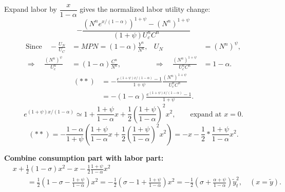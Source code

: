 \documentclass[11pt,fleqn]{article}
\begin{document}
Expand labor by $\dfrac{x}{1-\alpha}$ gives the normalized labor utility change:
\[
-\frac{\left(N^ne^{x/\left(1-\alpha\right)}\right)^{1+\psi}-\left(N^n\right)^{1+\psi}}{\left(1+\psi\right)U_c^nC^n}\tag{$\ast\ast$}
\]
\begin{align*}
\text{Since}\quad -\frac{U_N}{U_C}&=MPN=\left(1-\alpha\right)\frac{Y^n}{N^n},
& U_N&=\left(N^n\right)^\psi,\\[-1pt]
\Rightarrow\quad
\frac{\left(N^n\right)^\psi}{U_c^n}&=\left(1-\alpha\right)\frac{C^n}{N^n},
&\Rightarrow\quad
\frac{\left(N^n\right)^{1+\psi}}{U_c^nC^n}&=1-\alpha.
\end{align*}
\begin{align*}
\left(\ast\ast\right)&=-\frac{e^{\left(1+\psi\right)x/\left(1-\alpha\right)}-1}{1+\psi}
\frac{\left(N^n\right)^{1+\psi}}{U_c^nC^n}\\[-1pt]
&=-\left(1-\alpha\right)\frac{e^{\left(1+\psi\right)x/\left(1-\alpha\right)}-1}{1+\psi}.
\end{align*}
\[
e^{\left(1+\psi\right)x/\left(1-\alpha\right)}\simeq
1+\frac{1+\psi}{1-\alpha}x
+\frac12\left(\frac{1+\psi}{1-\alpha}\right)^2x^2,
\qquad\text{expand at }x=0.
\]
\[
\left(\ast\ast\right)=-\frac{1-\alpha}{1+\psi}
\left(\frac{1+\psi}{1-\alpha}x+\frac12\left(\frac{1+\psi}{1-\alpha}\right)^2x^2\right)
=-x-\frac12*\frac{1+\psi}{1-\alpha}x^2.
\]
\par\vspace{1em}
\textbf{Combine consumption part with labor part:}
\begin{align*}
&x+\frac12\left(1-\sigma\right)x^2-x-\frac12\frac{1+\psi}{1-\alpha}x^2\\[-1pt]
&\qquad=\frac12\left(1-\sigma-\frac{1+\psi}{1-\alpha}\right)x^2
=-\frac12\left(\sigma-1+\frac{1+\psi}{1-\alpha}\right)x^2
=-\frac12\left(\sigma+\frac{\alpha+\psi}{1-\alpha}\right)\tilde y_t^2,
\quad \left(x=\tilde y\right).
\end{align*}
\end{document}
